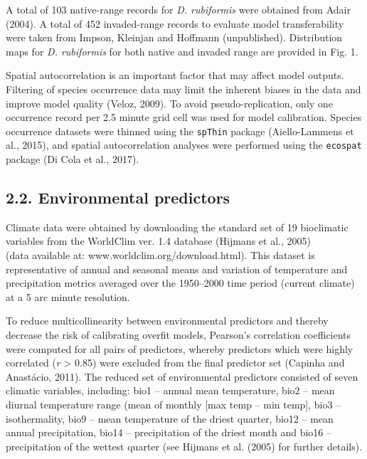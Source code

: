 \documentclass[12pt,]{article}
\begin{document}
A total of 103 native-range records for \emph{D. rubiformis} were
obtained from Adair (2004). A total of 452 invaded-range records to
evaluate model transferability were taken from Impson, Kleinjan and
Hoffmann (unpublished). Distribution maps for \emph{D. rubiformis} for
both native and invaded range are provided in Fig. 1.

Spatial autocorrelation is an important factor that may affect model
outputs. Filtering of species occurrence data may limit the inherent
biases in the data and improve model quality (Veloz, 2009). To avoid
pseudo-replication, only one occurrence record per 2.5 minute grid cell
was used for model calibration. Species occurrence datasets were thinned
using the \texttt{spThin} package (Aiello-Lammens et al., 2015), and
spatial autocorrelation analyses were performed using the
\texttt{ecospat} package (Di Cola et al., 2017).

\hypertarget{environmental-predictors}{%
\subsection{2.2. Environmental
predictors}\label{environmental-predictors}}

Climate data were obtained by downloading the standard set of 19
bioclimatic variables from the WorldClim ver. 1.4 database (Hijmans et
al., 2005)\\
(data available at: www.worldclim.org/download.html). This dataset is
representative of annual and seasonal means and variation of temperature
and precipitation metrics averaged over the 1950--2000 time period
(current climate) at a 5 arc minute resolution.

To reduce multicollinearity between environmental predictors and thereby
decrease the risk of calibrating overfit models, Pearson's correlation
coefficients were computed for all pairs of predictors, whereby
predictors which were highly correlated (\textbar{}\emph{r}\textbar{}
\textgreater{} 0.85) were excluded from the final predictor set (Capinha
and Anastácio, 2011). The reduced set of environmental predictors
consisted of seven climatic variables, including: bio1 -- annual mean
temperature, bio2 -- mean diurnal temperature range (mean of monthly
{[}max temp -- min temp{]}, bio3 -- isothermality, bio9 -- mean
temperature of the driest quarter, bio12 -- mean annual precipitation,
bio14 -- precipitation of the driest month and bio16 -- precipitation of
the wettest quarter (see Hijmans et al. (2005) for further details).
\end{document}
